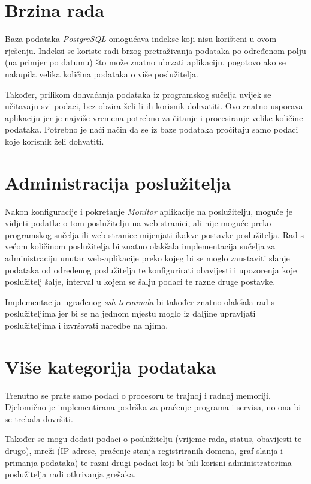 \documentclass[zavrsnirad]{fer}
\begin{document}
\section{Brzina rada}
Baza podataka \textit{PostgreSQL} omogućava indekse koji nisu korišteni u ovom rješenju. Indeksi se koriste radi brzog pretraživanja podataka po određenom polju (na primjer po datumu) što može znatno ubrzati aplikaciju, pogotovo ako se nakupila velika količina podataka o više poslužitelja.

Također, prilikom dohvaćanja podataka iz programskog sučelja uvijek se učitavaju svi podaci, bez obzira želi li ih korisnik dohvatiti. Ovo znatno usporava aplikaciju jer je najviše vremena potrebno za čitanje i procesiranje velike količine podataka. Potrebno je naći način da se iz baze podataka pročitaju samo podaci koje korisnik želi dohvatiti.

\section{Administracija poslužitelja}
Nakon konfiguracije i pokretanje \textit{Monitor} aplikacije na poslužitelju, moguće je vidjeti podatke o tom poslužitelju na web-stranici, ali nije moguće preko programskog sučelja ili web-stranice mijenjati ikakve postavke poslužitelja. Rad s većom količinom poslužitelja bi znatno olakšala implementacija sučelja za administraciju unutar web-aplikacije preko kojeg bi se moglo zaustaviti slanje podataka od određenog poslužitelja te konfigurirati obavijesti i upozorenja koje poslužitelj šalje, interval u kojem se šalju podaci te razne druge postavke.

Implementacija ugrađenog \textit{ssh terminala} bi također znatno olakšala rad s poslužiteljima jer bi se na jednom mjestu moglo iz daljine upravljati poslužiteljima i izvršavati naredbe na njima.

\section{Više kategorija podataka}
Trenutno se prate samo podaci o procesoru te trajnoj i radnoj memoriji. Djelomično je implementirana podrška za praćenje programa i servisa, no ona bi se trebala dovršiti.

Također se mogu dodati podaci o poslužitelju (vrijeme rada, status, obavijesti te drugo), mreži (IP adrese, praćenje stanja registriranih domena, graf slanja i primanja podataka) te razni drugi podaci koji bi bili korisni administratorima poslužitelja radi otkrivanja grešaka.
\end{document}

